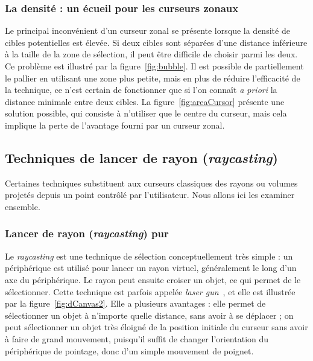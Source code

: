 
	\subsubsection{La densité : un écueil pour les curseurs zonaux}
	Le principal inconvénient d'un curseur zonal se présente lorsque la densité de cibles potentielles est élevée. Si deux cibles sont séparées d'une distance inférieure à la taille de la zone de sélection, il peut être difficile de choisir parmi les deux. Ce problème est illustré par la figure~\ref{fig:bubble}. Il est possible de partiellement le pallier en utilisant une zone plus petite, mais en plus de réduire l'efficacité de la technique, ce n'est certain de fonctionner que si l'on connaît \emph{a priori} la distance minimale entre deux cibles. La figure~\ref{fig:areaCursor} présente une solution possible, qui consiste à n'utiliser que le centre du curseur, mais cela implique la perte de l'avantage fourni par un curseur zonal.
	
	\subsection{Techniques de lancer de rayon (\emph{raycasting})}
	\label{sec:raycasting}
	Certaines techniques substituent aux curseurs classiques des rayons ou volumes projetés depuis un point contrôlé par l'utilisateur. Nous allons ici les examiner ensemble.

	\subsubsection{Lancer de rayon (\emph{raycasting}) pur}
	Le \emph{raycasting} est une technique de sélection conceptuellement très simple : un périphérique est utilisé pour lancer un rayon virtuel, généralement le long d'un axe du périphérique. Le rayon peut ensuite croiser un objet, ce qui permet de le sélectionner. Cette technique est parfois appelée \emph{laser gun}~\cite{liang1994jdcad}, et elle est illustrée par la figure~\ref{fig:dCanvas2}. Elle a plusieurs avantages : elle permet de sélectionner un objet à n'importe quelle distance, sans avoir à se déplacer ; on peut sélectionner un objet très éloigné de la position initiale du curseur sans avoir à faire de grand mouvement, puisqu'il suffit de changer l'orientation du périphérique de pointage, donc d'un simple mouvement de poignet.
	
